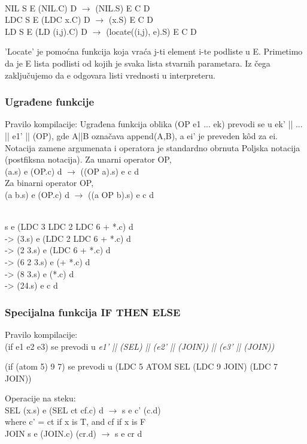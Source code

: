 \begin{primer} ~\\
NIL S E (NIL.C) D $\rightarrow$ (NIL.S) E C D\\
LDC S E (LDC x.C) D $\rightarrow$ (x.S) E C D\\
LD S E (LD (i,j).C) D $\rightarrow$ (locate((i,j), e).S) E C D\\
\end{primer}
'Locate' je pomoćna funkcija koja vraća j-ti element i-te podliste u E. Primetimo da je E lista podlisti od kojih je svaka lista stvarnih parametara. Iz čega zaključujemo da e odgovara listi vrednosti u interpreteru.

\subsubsection{Ugrađene funkcije}
Pravilo kompilacije: Ugrađena funkcija oblika (OP e1 ... ek) prevodi se u ek' || ... || e1' || (OP), gde A||B označava append(A,B), a ei' je preveden k\^od za ei. Notacija zamene argumenata i operatora je standardno obrnuta Poljska notacija (postfiksna notacija).
Za unarni operator OP,\\
(a.s) e (OP.c) d $\rightarrow$ ((OP a).s) e c d\\
Za binarni operator OP,\\
(a b.s) e (OP.c) d $\rightarrow$ ((a OP b).s) e c d
\begin{primer} ~\\
s e (LDC 3 LDC 2 LDC 6 + *.c) d\\
-> (3.s) e (LDC 2 LDC 6 + *.c) d\\
-> (2 3.s) e (LDC 6 + *.c) d\\
-> (6 2 3.s) e (+ *.c) d\\
-> (8 3.s) e (*.c) d\\
-> (24.s) e c d\\
\end{primer}
\subsubsection{Specijalna funkcija IF THEN ELSE}
\noindent Pravilo kompilacije:\\
(if e1 e2 e3) se prevodi u {\em e1' || (SEL) || (e2' || (JOIN)) || (e3' || (JOIN))}\\
\begin{primer}
(if (atom 5) 9 7) se prevodi u (LDC 5 ATOM SEL (LDC 9 JOIN) (LDC 7 JOIN))\\
\end{primer}
Operacije na steku:\\
SEL (x.s) e (SEL ct cf.c) d $\rightarrow$ s e c' (c.d)\\
where c' = ct if x is T, and cf if x is F\\
JOIN s e (JOIN.c) (cr.d) $\rightarrow$ s e cr d\\

